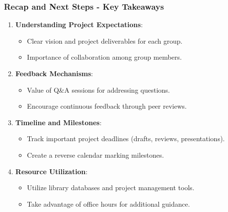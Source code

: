 \documentclass[aspectratio=169]{beamer}
\begin{document}
\begin{frame}[fragile]
    \frametitle{Recap and Next Steps - Key Takeaways}
    \begin{enumerate}
        \item \textbf{Understanding Project Expectations}:
        \begin{itemize}
            \item Clear vision and project deliverables for each group.
            \item Importance of collaboration among group members.
        \end{itemize}
        
        \item \textbf{Feedback Mechanisms}:
        \begin{itemize}
            \item Value of Q\&A sessions for addressing questions.
            \item Encourage continuous feedback through peer reviews.
        \end{itemize}
        
        \item \textbf{Timeline and Milestones}:
        \begin{itemize}
            \item Track important project deadlines (drafts, reviews, presentations).
            \item Create a reverse calendar marking milestones.
        \end{itemize}
        
        \item \textbf{Resource Utilization}:
        \begin{itemize}
            \item Utilize library databases and project management tools.
            \item Take advantage of office hours for additional guidance.
        \end{itemize}
    \end{enumerate}
\end{frame}
\end{document}
